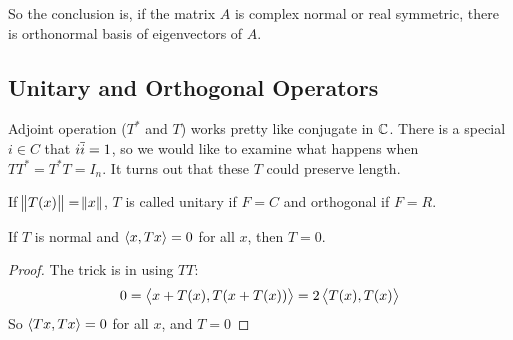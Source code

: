 So the conclusion is, if the matrix $A$ is complex normal or real symmetric, there is orthonormal basis of eigenvectors of $A$.

\subsection{Unitary and Orthogonal Operators}

Adjoint operation ($T^*$ and $T$) works pretty like conjugate in $\mathbb{C}$. There is a special $i \in C$  that $i \overline{i} = 1$, so we would like to examine what happens when $TT^* = T^* T = I_n$. It turns out that these $T$ could preserve length.

\begin{definition}\label{unitary}
    If $\norm{T(x)} = \norm{x}$, $T$ is called unitary if $F=C$ and orthogonal if $F=R$.
\end{definition}




\begin{theorem}\label{normal_zero_operator}
    If $T$ is normal and $\left\langle \displaystyle x, Tx \right\rangle = 0$ for all $x$, then $T=0$.
\end{theorem}
\begin{proof}
    The trick is in using $TT$:
    \begin{equation*}
        0 = \left\langle \displaystyle x + T(x), T(x + T(x)) \right\rangle = 2 \left\langle \displaystyle T(x), T(x) \right\rangle
    \end{equation*}
    So $\left\langle \displaystyle Tx, Tx \right\rangle = 0$ for all $x$, and $T = 0$
\end{proof}


